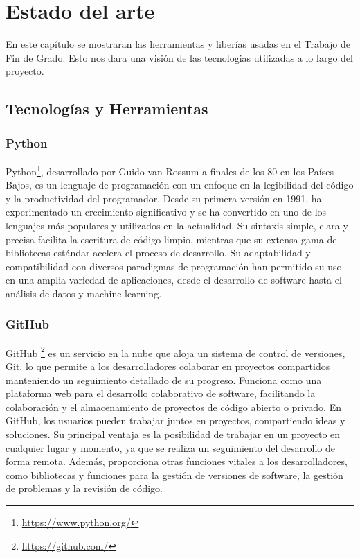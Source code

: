 \documentclass[a4paper, 12pt]{book}
\begin{document}

\cleardoublepage
\chapter{Estado del arte}
\label{chap:estado}

En este capítulo se mostraran las herramientas y liberías usadas en el Trabajo de Fin de Grado. Esto nos 
dara una visión de las tecnologias utilizadas a lo largo del proyecto.

\section{Tecnologías y Herramientas}
\label{sec:tecnologías y herramientas}

\subsection{Python} 
\label{subsec:Python} Python\footnote{\url{https://www.python.org/}}, desarrollado por Guido van Rossum a finales de los 80 en los Países Bajos, es un lenguaje 
de programación con un enfoque en la legibilidad del código y la productividad del programador. Desde su primera versión en 1991, ha 
experimentado un crecimiento significativo y se ha convertido en uno de los lenguajes más populares y utilizados en la actualidad. Su sintaxis simple, 
clara y precisa facilita la escritura de código limpio, mientras que su extensa gama de bibliotecas estándar acelera el proceso de desarrollo. 
Su adaptabilidad y compatibilidad con diversos paradigmas de programación han permitido su uso en una amplia variedad de aplicaciones, desde el 
desarrollo de software hasta el análisis de datos y machine learning.

\subsection{GitHub} 
\label{subsec:github} GitHub \footnote{\url{https://github.com/}} es un servicio en la nube que aloja un sistema de control de versiones, Git, lo que permite a los 
desarrolladores colaborar en proyectos compartidos manteniendo un seguimiento detallado de su progreso. Funciona como una plataforma web para el 
desarrollo colaborativo de software, facilitando la colaboración y el almacenamiento de proyectos de código abierto o privado. En GitHub, los usuarios 
pueden trabajar juntos en proyectos, compartiendo ideas y soluciones. Su principal ventaja es la posibilidad de trabajar en un proyecto en cualquier 
lugar y momento, ya que se realiza un seguimiento del desarrollo de forma remota. Además, proporciona otras funciones vitales a los desarrolladores, 
como bibliotecas y funciones para la gestión de versiones de software, la gestión de problemas y la revisión de código.
\end{document}
